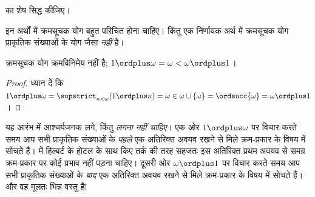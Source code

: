 \documentclass[../../../include/open-logic-section]{subfiles}
\begin{document}
\begin{prob}
 का शेष सिद्ध कीजिए।
\end{prob}

इन अर्थों में क्रमसूचक योग बहुत परिचित होना चाहिए। किंतु एक निर्णायक अर्थ
में क्रमसूचक योग प्राकृतिक संख्याओं के योग जैसा \emph{नहीं} है।

\begin{prop}
क्रमसूचक योग क्रमविनिमेय {नहीं} है;
$1 \ordplus \omega = \omega < \omega \ordplus 1$।
\end{prop}

\begin{proof}
ध्यान दें कि
$1 \ordplus \omega = \supstrict_{n < \omega} (1 \ordplus n)
= \omega \in \omega \cup \{\omega\} = \ordsucc{\omega}
= \omega \ordplus 1$।
\end{proof}
\noindent 
यह आरंभ में आश्चर्यजनक लगे, किंतु \emph{लगना नहीं चाहिए}। एक ओर
$1 \ordplus \omega$ पर विचार करते समय आप सभी प्राकृतिक संख्याओं के
\emph{पहले} एक अतिरिक्त अवयव रखने से मिले क्रम-प्रकार के विषय में सोचते हैं।
 में हिल्बर्ट के होटल के साथ किए तर्क की
तरह सहजतः इस अतिरिक्त प्रथम अवयव से समग्र क्रम-प्रकार पर कोई प्रभाव नहीं
पड़ना चाहिए। दूसरी ओर $\omega \ordplus 1$ पर विचार करते समय आप सभी
प्राकृतिक संख्याओं के \emph{बाद} एक अतिरिक्त अवयव रखने से मिले क्रम-प्रकार
के विषय में सोचते हैं। और वह मूलतः भिन्न वस्तु है!{}
\end{document}
